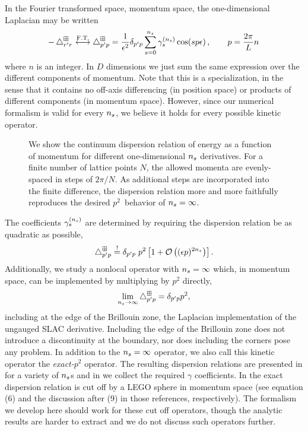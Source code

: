 In the Fourier transformed space, momentum space, the one-dimensional Laplacian may be written
\begin{equation}
    \label{eq:laplacian}
    -\mathop{}\!\mathbin\bigtriangleup_{r'r^{}}^\boxplus
    \overset{\text{F.T.}}{\longleftrightarrow}
    \mathop{}\!\mathbin\bigtriangleup^\boxplus_{p'p}
    =
    \frac{1}{\epsilon^2}
    \delta_{p'p}
    \sum_{s=0}^{{n_s}} \gamma_s^{({n_s})} \cos(s p \epsilon)
    \, , \qquad p = \frac{2 \pi}{L} n \,
\end{equation}
where $n$ is an integer.
In $D$ dimensions we just sum the same expression over the different components of momentum.
Note that this is a specialization, in the sense that it contains no off-axis differencing (in position space) or products of different components (in momentum space).
However, since our numerical formalism is valid for every ${n_s}$, we believe it holds for every possible kinetic operator.

\begin{figure}
    
    \caption{We show the continuum dispersion relation of energy as a function of momentum for different one-dimensional ${n_s}$ derivatives.  For a finite number of lattice points $N$, the allowed momenta are evenly-spaced in steps of $2\pi/N$.
    As additional steps are incorporated into the finite difference, the dispersion relation more and more faithfully reproduces the desired $p^2$~behavior of ${n_s}=\infty$.
    }
    \label{fig:dispersion relation}
\end{figure}

The coefficients $\gamma_{s}^{({n_s})}$ are determined by requiring the dispersion relation be as quadratic as possible,
\begin{equation}
    \label{eq:gamma determination}
    \mathop{}\!\mathbin\bigtriangleup^\boxplus_{p'p}
    \overset{!}{=}
    \delta_{p'p} \;
    p^2 \left[
        1 + \mathcal{O}\left((\epsilon p)^{2{n_s}}\right)
    \right].
\end{equation}
Additionally, we study a nonlocal operator with ${n_s}=\infty$ which, in momentum space, can be implemented by multiplying by $p^2$ directly,
\begin{equation}
    \lim\limits_{n_s \to \infty}
    \mathop{}\!\mathbin\bigtriangleup^\boxplus_{p'p}
    =
    \delta_{p'p} p^2,
\end{equation}
including at the edge of the Brillouin zone, the Laplacian implementation of the ungauged SLAC derivative.
Including the edge of the Brillouin zone does not introduce a discontinuity at the boundary, nor does including the corners pose any problem.
In addition to the ${n_s}=\infty$ operator, we also call this kinetic operator the \emph{exact-$p^2$} operator.
The resulting dispersion relations are presented in  for a variety of ${n_s}$s and in  we collect the required $\gamma$ coefficients.
In  the exact dispersion relation is cut off by a LEGO sphere in momentum space (see equation (6) and the discussion after (9) in those references, respectively).
The formalism we develop here should work for these cut off operators, though the analytic results are harder to extract and we do not discuss such operators further.

